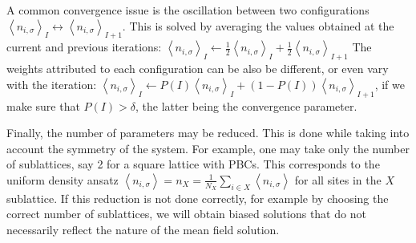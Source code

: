 A common convergence issue is the oscillation between two configurations $\left\langle n_{i,\sigma}\right\rangle_I \leftrightarrow \left\langle n_{i,\sigma}\right\rangle_{I+1}$.
This is solved by averaging the values obtained at the current and previous iterations: $\left\langle n_{i,\sigma}\right\rangle_I \leftarrow \frac{1}{2} \left\langle n_{i,\sigma}\right\rangle_I + \frac{1}{2} \left\langle n_{i,\sigma}\right\rangle_{I+1}$
The weights attributed to each configuration can be also be different, or even vary with the iteration: $\left\langle n_{i,\sigma}\right\rangle_I \leftarrow P(I) \left\langle n_{i,\sigma}\right\rangle_I + (1 - P(I) ) \left\langle n_{i,\sigma}\right\rangle_{I+1}$, if we make sure that $P(I) > \delta$, the latter being the convergence parameter.

Finally, the number of parameters may be reduced.
This is done while taking into account the symmetry of the system.
For example, one may take only the number of sublattices, say 2 for a square lattice with \acp{PBC}.
This corresponds to the uniform density ansatz $\left\langle n_{i,\sigma} \right\rangle = n_X = \frac{1}{N_X} \sum_{i \in X} \left\langle n_{i,\sigma} \right\rangle$ for all sites in the $X$ sublattice.
If this reduction is not done correctly, for example by choosing the correct number of sublattices, we will obtain biased solutions that do not necessarily reflect the nature of the mean field solution.
